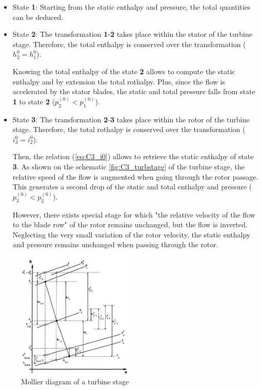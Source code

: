 \begin{itemize}
\item State \textbf{1}: Starting from the static enthalpy and pressure, the total quantities can be deduced.
\item State \textbf{2}: The transformation \textbf{1}-\textbf{2} takes place within the stator of the turbine stage. Therefore, the total enthalpy is conserved over the transformation ($h_2^0=h_1^0$). 

Knowing the total enthalpy of the state \textbf{2} allows to compute the static enthalpy and by extension the total rothalpy. Plus, since the flow is accelerated by the stator blades, the static and total pressure falls from state \textbf{1} to state \textbf{2} ($p_2^{(0)}<p_1^{(0)}$).
\item State \textbf{3}: The transformation \textbf{2}-\textbf{3} takes place within the rotor of the turbine stage. Therefore, the total rothalpy is conserved over the transformation ($i_3^0=i_2^0$).

Then, the relation (\ref{eq:C3_i0}) allows to retrieve the static enthalpy of state \textbf{3}. As shown on the schematic \ref{fig:C3_turbstage} of the turbine stage, the relative speed of the flow is augmented when going through the rotor passage. This generates a second drop of the static and total enthalpy and pressure ($p_3^{(0)}<p_2^{(0)}$). 

However, there exists special stage for which "the relative velocity of the flow to the blade row" of the rotor\citep{Hillewaert2019} remains unchanged, but the flow is inverted. Neglecting the very small variation of the rotor velocity, the static enthalpy and pressure remains unchanged when passing through the rotor.
\end{itemize} 

\begin{figure}[h]
\centering
\includegraphics[width=0.5\textwidth]{Turb_mollier.png}
\caption{Mollier diagram of a turbine stage \citep{Hillewaert2019}}
\label{fig:C3_Mollierturb}
\end{figure}

